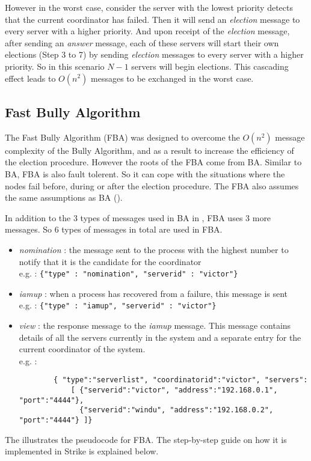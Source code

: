 \documentclass[dareport.tex]{subfiles}
\begin{document}
However in the worst case, consider the server with the lowest priority detects that the current coordinator has failed. Then it will send an \emph{election} message to every server with a higher priority. And upon receipt of the \emph{election} message, after sending an \emph{answer} message, each of these servers will start their own elections (Step 3 to 7) by sending \emph{election} messages to every server with a higher priority. So in this scenario $ N-1 $ servers will begin elections. This cascading effect leads to $ O(n^2) $ messages to be exchanged in the worst case.

\subsection{Fast Bully Algorithm} \label{ssec:fast-bully}
The Fast Bully Algorithm (FBA)\cite{fastbully} was designed to overcome the $ O(n^2) $ message complexity of the Bully Algorithm, and as a result to increase the efficiency of the election procedure. However the roots of the FBA come from BA. Similar to BA, FBA is also fault tolerent. So it can cope with the situations where the nodes fail before, during or after the election procedure. The FBA also assumes the same assumptions as BA ().

In addition to the 3 types of messages used in BA in , FBA uses 3 more messages. So 6 types of messages in total are used in FBA.
\begin{itemize}\label{fba-message-types}
	\item \emph{nomination} : the message sent to the process with the highest number to notify that it is the candidate for the coordinator\\
	e.g. : \verb|{"type" : "nomination", "serverid" : "victor"}|
	\item \emph{iamup} : when a process has recovered from a failure, this message is sent\\
	e.g. : \verb|{"type" : "iamup", "serverid" : "victor"}|
	\item \emph{view} : the response message to the \emph{iamup} message. This message contains details of all the servers currently in the system and a separate entry for the current coordinator of the system.\\
	e.g. :
	\begin{small}
		\begin{verbatim}
		{ "type":"serverlist", "coordinatorid":"victor", "servers": 
		    [ {"serverid":"victor", "address":"192.168.0.1", "port":"4444"},
		  	  {"serverid":"windu", "address":"192.168.0.2", "port":"4444"} ]}
		\end{verbatim}
	\end{small}
\end{itemize}
The  illustrates the pseudocode for FBA. The step-by-step guide on how it is implemented in Strike is explained below.
\end{document}
